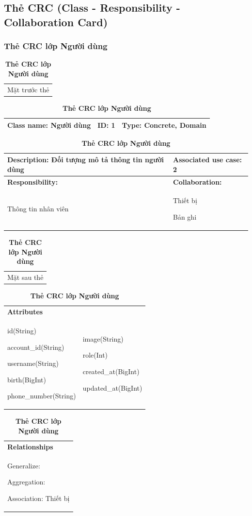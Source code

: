 \subsection{Thẻ CRC (Class - Responsibility - Collaboration Card)}

\subsubsection{Thẻ CRC lớp Người dùng}
  \begin{table}[H]
    \caption{\bfseries \fontsize{12pt}{0pt}\selectfont Thẻ CRC lớp Người dùng}
    \centering
    \begin{tabularx}{0.9\textwidth}{X}
      Mặt trước thẻ
    \end{tabularx}
    \begin{tabularx}{0.9\textwidth}{|X|X|X|}
      \hline
      \textbf{Class name:} Người dùng & \textbf{ID:} 1 & \textbf{Type:} Concrete, Domain \\
      \hline
    \end{tabularx}
    \begin{tabularx}{0.9\textwidth}{|X|X|}
      \textbf{Description:} Đối tượng mô tả thông tin người dùng & \textbf{Associated use case:} 2 \\
      \hline
      \textbf{Responsibility:} & \textbf{Collaboration:} \\
      Thông tin nhân viên 
      & 
      Thiết bị
      
      Bản ghi
      \\
      \hline
    \end{tabularx}
    \begin{tabularx}{0.9\textwidth}{X}
      Mặt sau thẻ
    \end{tabularx}
    \begin{tabularx}{0.9\textwidth}{|X|X|}
      \hline
      \textbf{Attributes} & \\
      id(String) 
      
      account\_id(String)

      username(String)

      birth(BigInt)

      phone\_number(String)
      & 
      image(String) 
      
      role(Int) 
      
      created\_at(BigInt)

      updated\_at(BigInt)
      \\
      \hline
    \end{tabularx}
    \begin{tabularx}{0.9\textwidth}{|X|}
      \textbf{Relationships} \\
      Generalize:  

      Aggregation:  
      
      Association: Thiết bị 
      \\
      \hline
    \end{tabularx}
  \end{table}

